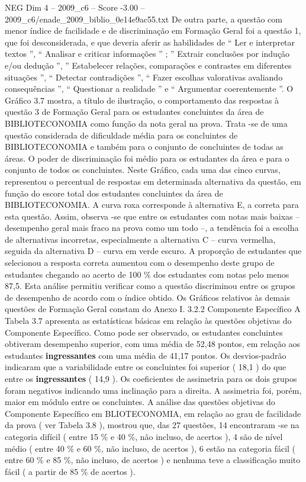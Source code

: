 \begin{textsample}{NEG Dim 4 – 2009\_c6 – Score -3.00 – 2009\_c6/enade\_2009\_biblio\_0e14e9ac55.txt}
De outra parte, a questão com menor índice de facilidade e de discriminação em Formação Geral foi a questão 1, que foi desconsiderada, e que deveria aferir as habilidades de “ Ler e interpretar textos ”, “ Analisar e criticar informações ” ; ” Extrair conclusões por indução e/ou dedução ”, ” Estabelecer relações, comparações e contrastes em diferentes situações ”, “ Detectar contradições ”, “ Fazer escolhas valorativas avaliando consequências ”, “ Questionar a realidade ” e “ Argumentar coerentemente ”.
O Gráfico 3.7 mostra, a título de ilustração, o comportamento das respostas à questão 3 de Formação Geral para os estudantes concluintes da área de BIBLIOTECONOMIA como função da nota geral na prova.
Trata -se de uma questão considerada de dificuldade média para os concluintes de BIBLIOTECONOMIA e também para o conjunto de concluintes de todas as áreas.
O poder de discriminação foi médio para os estudantes da área e para o conjunto de todos os concluintes.
Neste Gráfico, cada uma das cinco curvas, representou o percentual de respostas em determinada alternativa da questão, em função do escore total dos estudantes concluintes da área de BIBLIOTECONOMIA.
A curva roxa corresponde à alternativa E, a correta para esta questão.
Assim, observa -se que entre os estudantes com notas mais baixas – desempenho geral mais fraco na prova como um todo –, a tendência foi a escolha de alternativas incorretas, especialmente a alternativa C – curva vermelha, seguida da alternativa D – curva em verde escuro.
A proporção de estudantes que selecionou a resposta correta aumentou com o desempenho deste grupo de estudantes chegando ao acerto de 100 \% dos estudantes com notas pelo menos 87,5.
Esta análise permitiu verificar como a questão discriminou entre os grupos de desempenho de acordo com o índice obtido.
Os Gráficos relativos às demais questões de Formação Geral constam do Anexo I. 3.2.2 Componente Específico A Tabela 3.7 apresenta as estatísticas básicas em relação às questões objetivas do Componente Específico.
Como pode ser observado, os estudantes concluintes obtiveram desempenho superior, com uma média de 52,48 pontos, em relação aos estudantes \textbf{ingressantes} com uma média de 41,17 pontos.
Os desvios-padrão indicaram que a variabilidade entre os concluintes foi superior ( 18,1 ) do que entre os \textbf{ingressantes} ( 14,9 ).
Os coeficientes de assimetria para os dois grupos foram negativos indicando uma inclinação para a direita.
A assimetria foi, porém, maior em módulo entre os concluintes.
A análise das questões objetivas do Componente Específico em BLIOTECONOMIA, em relação ao grau de facilidade da prova ( ver Tabela 3.8 ), mostrou que, das 27 questões, 14 encontraram -se na categoria difícil ( entre 15 \% e 40 \%, não incluso, de acertos ), 4 são de nível médio ( entre 40 \% e 60 \%, não incluso, de acertos ), 6 estão na categoria fácil ( entre 60 \% e 85 \%, não incluso, de acertos ) e nenhuma teve a classificação muito fácil ( a partir de 85 \% de acertos ).

\end{textsample}
